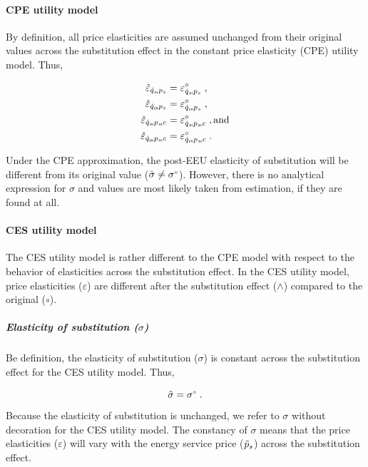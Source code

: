 \documentclass[12pt]{article}\usepackage[]{graphicx}\usepackage[]{xcolor}
\begin{document}
\paragraph{CPE utility model} 

By definition, all price elasticities are assumed unchanged 
from their original values 
across the substitution effect
in the constant price elasticity (CPE) utility model. 
Thus, 

\begin{align} \label{eq:cpe_hat_elasticities}
  \eqspsUChat &= \eqspsUCorig \; , \\
  \eqopsUChat &= \eqopsUCorig \; , \\
  \eqspsChat &= \eqspsCorig \; , \mathrm{and} \\
  \eqopsChat &= \eqopsCorig \; .
\end{align}

Under the CPE approximation, the post-EEU elasticity of substitution will
be different from its original value ($\hat{\sigma} \ne {}{\sigma}^{\scriptscriptstyle \circ}$). 
However, there is no analytical expression for $\sigma$ and 
values are most likely taken from estimation, if they are found at all.


\paragraph{CES utility model} 

The CES utility model is rather different to the CPE model with respect to the 
behavior of elasticities across the substitution effect.
In the CES utility model, 
price elasticities ($\varepsilon$) are different 
after the substitution effect ($\wedge$) 
compared to the original ($\circ$).


\subparagraph{Elasticity of substitution ($\sigma$)} 

Be definition, the elasticity of substitution ($\sigma$)
is constant across the substitution effect for the CES utility model.
Thus,

\begin{equation}
  \hat{\sigma} = {}{\sigma}^{\scriptscriptstyle \circ} \; .
\end{equation}
%
Because the elasticity of substitution is unchanged, 
we refer to $\sigma$ without decoration for the CES utility model.
The constancy of $\sigma$ means that the price elasticities ($\varepsilon$)
will vary with the energy service price ($\tilde{p}_s$) 
across the substitution effect.
\end{document}
